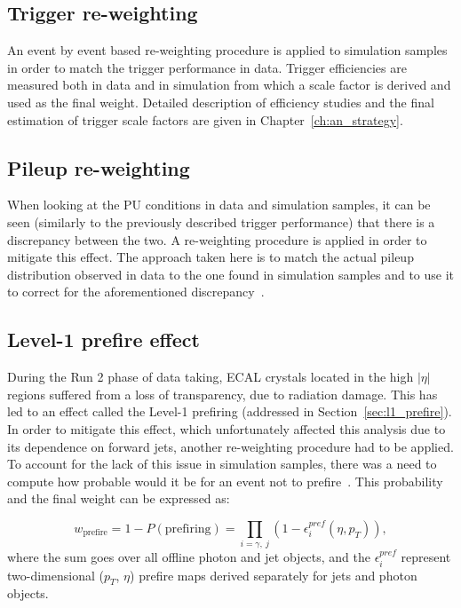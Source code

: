 \subsection{Trigger re-weighting}
\hspace{10pt} An event by event based re-weighting procedure is applied to simulation samples in order to match the trigger performance in data. Trigger efficiencies are measured both in data and in simulation from which a scale factor is derived and used as the final weight. Detailed description of efficiency studies and the final estimation of trigger scale factors are given in Chapter~\ref{ch:an_strategy}.

\subsection{Pileup re-weighting}
\hspace{10pt} When looking at the PU conditions in data and simulation samples, it can be seen (similarly to the previously described trigger performance) that there is a discrepancy between the two. A re-weighting procedure is applied in order to mitigate this effect. The approach taken here is to match the actual pileup distribution observed in data to the one found in simulation samples and to use it to correct for the aforementioned discrepancy~\cite{note:AN_19_257,twiki_lumi_pog}.
\subsection{Level-1 prefire effect}
\hspace{10pt} During the Run 2 phase of data taking, ECAL crystals located in the high $|\eta|$ regions suffered from a loss of transparency, due to radiation damage. This has led to an effect called the Level-1 prefiring (addressed in Section~\ref{sec:l1_prefire}). In order to mitigate this effect, which unfortunately affected this analysis due to its dependence on forward jets, another re-weighting procedure had to be applied. To account for the lack of this issue in simulation samples, there was a need to compute how probable would it be for an event not to prefire~\cite{twiki_egamma_prefire}. This probability and the final weight can be expressed as:

\begin{equation}
    w_{\text{prefire}} = 1-P(\text{prefiring}) = \prod_{i=\gamma,~j} (1-\epsilon_i^{pref}(\eta,p_T)),
\end{equation}
where the sum goes over all offline photon and jet objects, and the $\epsilon_i^{pref}$ represent two-dimensional ($p_T$, $\eta$) prefire maps derived separately for jets and photon objects.

